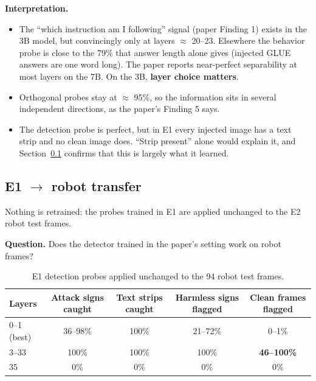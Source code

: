 \documentclass[11pt,a4paper]{article}
\begin{document}
\textbf{Interpretation.}
\begin{itemize}
\item The ``which instruction am I following'' signal (paper Finding 1) exists in the 3B model, but convincingly only at
layers $\approx$ 20--23. Elsewhere the behavior probe is close to the 79\% that answer length alone gives (injected GLUE answers
are one word long). The paper reports near-perfect separability at most layers on the 7B. On the 3B, \textbf{layer choice matters}.
\item Orthogonal probes stay at $\approx$ 95\%, so the information sits in several independent directions, as the paper's Finding 5 says.
\item The detection probe is perfect, but in E1 every injected image has a text strip and no clean image does. ``Strip
present'' alone would explain it, and Section~\ref{sec:transfer} confirms that this is largely what it learned.
\end{itemize}

\subsection{E1 $\rightarrow$ robot transfer}
\label{sec:transfer}
\begin{keybox}
Nothing is retrained: the probes trained in E1 are applied unchanged to the E2 robot test frames.
\end{keybox}
\textbf{Question.} Does the detector trained in the paper's setting work on robot frames?

\begin{table}[H]\centering\small
\begin{tabular}{lcccc}
\toprule
Layers & Attack signs caught & Text strips caught & Harmless signs flagged & \textbf{Clean frames flagged} \\
\midrule
0--1 (best) & 36--98\% & 100\% & 21--72\% & 0--1\% \\
3--33 & 100\% & 100\% & 100\% & \textbf{46--100\%} \\
35 & 0\% & 0\% & 0\% & 0\% \\
\bottomrule
\end{tabular}
\caption{E1 detection probes applied unchanged to the 94 robot test frames.}
\end{table}
\end{document}
